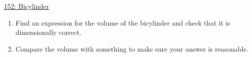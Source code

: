 \documentclass{ximera}
\begin{document}
\begin{onlineOnly}
    \begin{center}
\end{center}
\end{onlineOnly}

\href{https://www.desmos.com/3d/wzzhod4ya6}{152: Bicylinder}

\begin{enumerate}
\item Find an expression for the volume of the bicylinder and check that it is dimensionally correct.

\item Compare the volume with something to make sure your answer is reasonable.

\end{enumerate}
\end{document}
